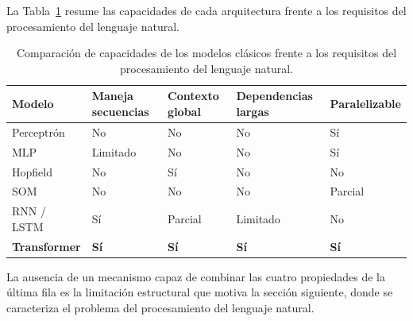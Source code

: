La Tabla~\ref{tab:comparacion_clasicos} resume las capacidades de cada
arquitectura frente a los requisitos del procesamiento del lenguaje natural.

\begin{table}[H]
\centering
\caption{Comparación de capacidades de los modelos clásicos frente a los
requisitos del procesamiento del lenguaje natural.}
\label{tab:comparacion_clasicos}
\begin{tabularx}{\textwidth}{lXXXX}
\toprule
\textbf{Modelo} & \textbf{Maneja secuencias} & \textbf{Contexto global} & \textbf{Dependencias largas} & \textbf{Paralelizable} \\
\midrule
Perceptrón           & No       & No       & No       & Sí      \\
MLP                  & Limitado & No       & No       & Sí      \\
Hopfield             & No       & Sí       & No       & No      \\
SOM                  & No       & No       & No       & Parcial \\
RNN / LSTM           & Sí       & Parcial  & Limitado & No      \\
\midrule
\textbf{Transformer} & \textbf{Sí} & \textbf{Sí} & \textbf{Sí} & \textbf{Sí} \\
\bottomrule
\end{tabularx}
\end{table}

La ausencia de un mecanismo capaz de combinar las cuatro propiedades de la
última fila es la limitación estructural que motiva la sección siguiente,
donde se caracteriza el problema del procesamiento del lenguaje natural.
